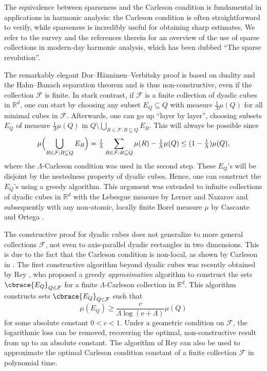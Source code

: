 \documentclass[a4paper, oneside,11pt]{amsart}
\theoremstyle{definition}
\theoremstyle{remark}
\numberwithin{equation}{section}
\newcommand{\R}{\ensuremath{\mathbb{R}}}
\newcommand{\mc}{\mathcal}
\DeclarePairedDelimiter\cbrace\{\}
\newcommand{\has}[1]{\Bigl(#1\Bigr)}
\newcommand{\ee}{\mathrm{e}}
\begin{document}
The equivalence between sparseness and the Carleson condition is fundamental in applications in harmonic analysis: the Carleson condition is often straightforward to verify, while sparseness is incredibly useful for obtaining sharp estimates. We refer to the survey \cite{Pe19c} and the references therein for an overview of the use of sparse collections in modern-day harmonic analysis, which has been dubbed ``The sparse revolution''.

\bigskip

The remarkably elegant Dor--H\"anninen--Verbitsky proof is based on duality and the Hahn--Banach separation theorem and is thus non-constructive, even if the collection $\mc{F}$ is finite. In stark contrast, if $\mc{F}$ is a finite collection of dyadic cubes in $\R^d$, one can start by choosing any subset $E_Q \subseteq Q$ with measure $\frac1\Lambda\mu(Q)$ for all minimal cubes in $\mc{F}$. Afterwards, one can go up ``layer by layer'', choosing subsets $E_Q$ of measure $\frac{1}{\Lambda}\mu(Q)$ in $Q\setminus \bigcup_{R\in \mc{F}:R\subsetneq Q}E_R$. This will always be possible since
$$
\mu\has{\bigcup_{R\in \mc{F}:R\subsetneq Q}E_R} = \tfrac{1}{\Lambda} \sum_{R\in \mc{F}:R\subseteq Q}\mu(R)-\tfrac{1}{\Lambda} \mu(Q)\leq    (1-\tfrac{1}{\Lambda})\mu(Q),
$$
where the
 $\Lambda$-Carleson condition was used in the second step. These $E_Q$'s will be disjoint by the nestedness property of dyadic cubes. Hence, one can construct the $E_Q$'s using a greedy algorithm. This argument was extended to infinite collections of dyadic cubes in $\R^d$ with the Lebesgue measure by Lerner and Nazarov \cite[Lemma 6.3]{LN15} and subsequently with any non-atomic, locally finite Borel measure $\mu$ by Cascante and Ortega \cite[Theorem 4.3]{CO17}.

The constructive proof for dyadic cubes does not generalize to more general collections $\mc{F}$, not even to axis-parallel dyadic rectangles in two dimensions. This is due to the fact that the Carleson condition is non-local, as shown by Carleson in \cite{ca74}.
The first constructive algorithm beyond dyadic cubes was recently obtained by Rey \cite{Re22}, who  proposed a greedy \emph{approximation} algorithm to construct the sets $\cbrace{E_Q}_{Q \in \mc{F}}$ for a finite $\Lambda$-Carleson collection in $\R^d$. This algorithm constructs sets $\cbrace{E_Q}_{Q \in \mc{F}}$ such that $$\mu(E_Q) \geq \frac{c}{\Lambda \log(\ee+\Lambda)} \mu(Q)$$ for some absolute constant $0<c<1$. Under a geometric condition on $\mc{F}$, the logarithmic loss can be removed, recovering the optimal, non-constructive result from \cite{Haen18} up to an absolute constant. The algorithm of Rey can also be used to approximate the optimal Carleson condition constant of a finite collection $\mc{F}$ in polynomial time.
\end{document}
